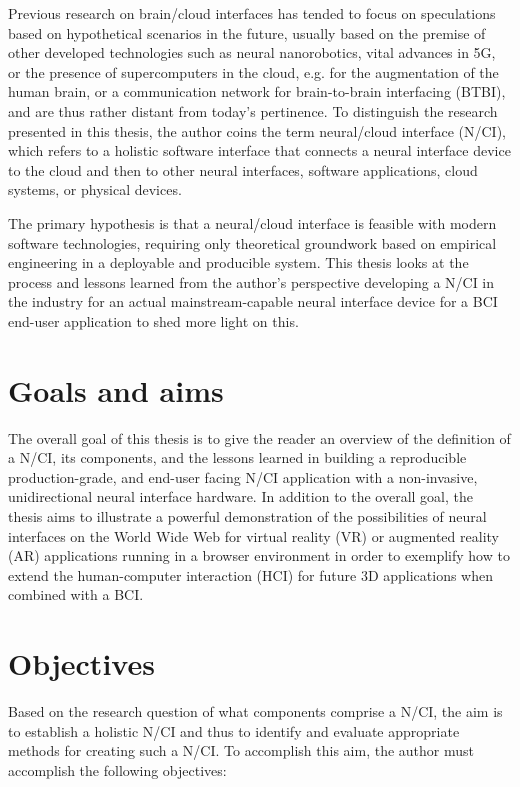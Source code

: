 Previous research on brain/cloud interfaces has tended to focus on speculations based on hypothetical scenarios in the future, usually based on the premise of other developed technologies such as neural nanorobotics, vital advances in 5G, or the presence of supercomputers in the cloud, e.g. for the augmentation of the human brain, or a communication network for brain-to-brain interfacing (BTBI), and are thus rather distant from today's pertinence. To distinguish the research presented in this thesis, the author coins the term neural/cloud interface (N/CI), which refers to a holistic software interface that connects a neural interface device to the cloud and then to other neural interfaces, software applications, cloud systems, or physical devices.

The primary hypothesis is that a neural/cloud interface is feasible with modern software technologies, requiring only theoretical groundwork based on empirical engineering in a deployable and producible system. This thesis looks at the process and lessons learned from the author's perspective developing a N/CI in the industry for an actual mainstream-capable neural interface device for a BCI end-user application to shed more light on this.

\section{Goals and aims}
\label{chapter1-goals-and-aims}

The overall goal of this thesis is to give the reader an overview of the definition of a N/CI, its components, and the lessons learned in building a reproducible production-grade, and end-user facing N/CI application with a non-invasive, unidirectional neural interface hardware. In addition to the overall goal, the thesis aims to illustrate a powerful demonstration of the possibilities of neural interfaces on the World Wide Web for virtual reality (VR) or augmented reality (AR) applications running in a browser environment in order to exemplify how to extend the human-computer interaction (HCI) for future 3D applications when combined with a BCI.

\section{Objectives}
\label{chapter1-objectives}

Based on the research question of what components comprise a N/CI, the aim is to establish a holistic N/CI and thus to identify and evaluate appropriate methods for creating such a N/CI. To accomplish this aim, the author must accomplish the following objectives:

